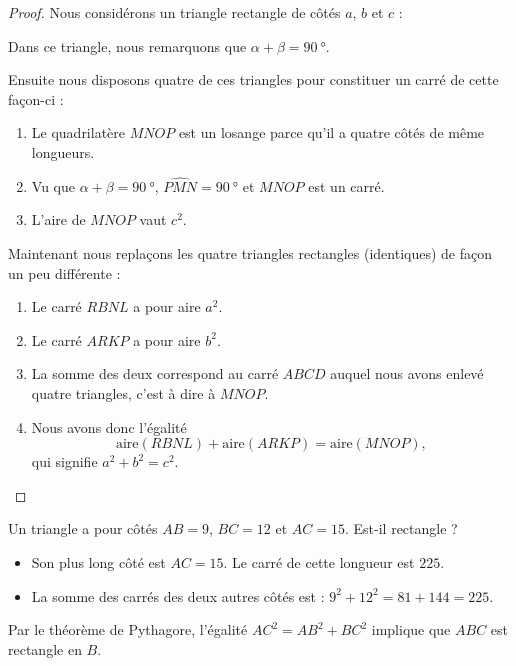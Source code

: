 \begin{proof}

    Nous considérons un triangle rectangle de côtés \( a\), \( b\) et \( c\) :
\begin{center}
   
\end{center}

Dans ce triangle, nous remarquons que \( \alpha+\beta=\SI{90}{\degree}\).

Ensuite nous disposons quatre de ces triangles pour constituer un carré de cette façon-ci :
\begin{center}
   
\end{center}


\begin{enumerate}
    \item
        Le quadrilatère \( MNOP\) est un losange parce qu'il a quatre côtés de même longueurs.
    \item
        Vu que \( \alpha+\beta=\SI{90}{\degree}\), \( \widehat{PMN}=\SI{90}{\degree}\) et \( MNOP\) est un carré.
    \item
        L'aire de \( MNOP\) vaut \( c^2\).
\end{enumerate}

Maintenant nous replaçons les quatre triangles rectangles (identiques) de façon un peu différente :

\begin{center}
   
\end{center}

\begin{enumerate}
    \item
        Le carré \( RBNL\) a pour aire \( a^2\).
    \item
        Le carré \( ARKP\) a pour aire \( b^2\).
    \item
        La somme des deux correspond au carré \( ABCD\) auquel nous avons enlevé quatre triangles, c'est à dire à \( MNOP\).
    \item
        Nous avons donc l'égalité
        \begin{equation}
            \text{aire}(RBNL)+\text{aire}(ARKP)=\text{aire}(MNOP),
        \end{equation}
        qui signifie \( a^2+b^2=c^2\).
\end{enumerate}

\end{proof}

\begin{example}
    Un triangle a pour côtés \( AB=9\), \( BC=12\) et \( AC=15\). Est-il rectangle ?
    \begin{itemize}
        \item Son plus long côté est \( AC=15\). Le carré de cette longueur est \( 225\).
        \item La somme des carrés des deux autres côtés est : \( 9^2+12^2=81+144=225\).
    \end{itemize}
    Par le théorème de Pythagore, l'égalité \( AC^2=AB^2+BC^2\) implique que \( ABC\) est rectangle en \( B\).
\end{example}


